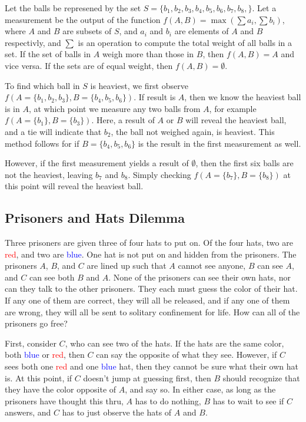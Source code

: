 \documentclass[12pt]{article}
\begin{document}
	Let the balls be represened by the set $S = \{b_1, b_2, b_3, b_4, b_5, b_6, b_7, b_8, \}$. Let a measurement be the output of the function $f(A, B) =  \max(\sum a_i, \sum b_i)$, where $A$ and $B$ are subsets of $S$, and $a_i$ and $b_i$ are elements of $A$ and $B$ respectivly, and $\sum$ is an operation to compute the total weight of all balls in a set. If the set of balls in $A$ weigh more than those in $B$, then $f(A, B) = A$ and vice versa. If the sets are of equal weight, then $f(A, B) = \emptyset$. \hfill \null \linebreak

	To find which ball in $S$ is heaviest, we first observe $f(A = \{b_1, b_2, b_3\}, B = \{b_4, b_5, b_6\})$. If result is $A$, then we know the heaviest ball is in $A$, at which point we measure any two balls from $A$, for example $f(A = \{b_1\}, B = \{b_3\})$. Here, a result of $A$ or $B$ will reveal the heaviest ball, and a tie will indicate that $b_2$, the ball not weighed again, is heaviest. This method follows for if $B = \{b_4, b_5, b_6\}$ is the result in the first measurement as well. \linebreak

	However, if the first measurement yields a result of $\emptyset$, then the first six balls are not the heaviest, leaving $b_7$ and $b_8$. Simply checking $f(A = \{b_7\}, B = \{b_8\})$ at this point will reveal the heaviest ball.

	\subsection{Prisoners and Hats Dilemma}
	Three prisoners are given three of four hats to put on. Of the four hats, two are \textcolor{red}{red}, and two are \textcolor{blue}{blue}. One hat is not put on and hidden from the prisoners. The prisoners $A$, $B$, and $C$ are lined up such that $A$ cannot see anyone, $B$ can see $A$, and $C$ can see both $B$ and $A$. None of the prisoners can see their own hats, nor can they talk to the other prisoners. They each must guess the color of their hat. If any one of them are correct, they will all be released, and if any one of them are wrong, they will all be sent to solitary confinement for life. How can all of the prisoners go free? \linebreak

	First, consider $C$, who can see two of the hats. If the hats are the same color, both \textcolor{blue}{blue} or \textcolor{red}{red}, then $C$ can say the opposite of what they see. However, if $C$ sees both one \textcolor{red}{red} and one \textcolor{blue}{blue} hat, then they cannot be sure what their own hat is. At this point, if $C$ doesn't jump at guessing first, then $B$ should recognize that they have the color opposite of $A$, and say so. In either case, as long as the prisoners have thought this thru, $A$ has to do nothing, $B$ has to wait to see if $C$ answers, and $C$ has to just observe the hats of $A$ and $B$.
\end{document}
